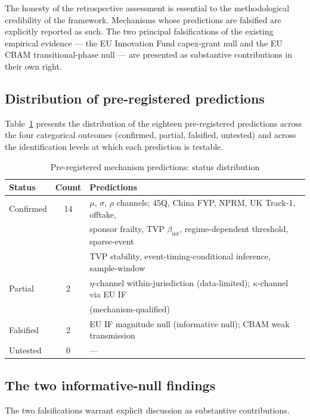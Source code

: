 \documentclass[12pt,a4paper]{article}
\newcommand{\bint}{\beta_{\text{int}}}
\theoremstyle{plain}
\theoremstyle{definition}
\begin{document}
The honesty of the retrospective assessment is essential to the methodological credibility of the framework. Mechanisms whose predictions are falsified are explicitly reported as such. The two principal falsifications of the existing empirical evidence --- the EU Innovation Fund capex-grant null and the EU CBAM transitional-phase null --- are presented as substantive contributions in their own right.

\subsection{Distribution of pre-registered predictions}
\label{sec:falsifiability-distribution}

Table~\ref{tab:falsifiability-summary} presents the distribution of the eighteen pre-registered predictions across the four categorical outcomes (confirmed, partial, falsified, untested) and across the identification levels at which each prediction is testable.

\begin{table}[!htbp]
\centering
\caption{Pre-registered mechanism predictions: status distribution}
\label{tab:falsifiability-summary}
\small
\begin{tabular}{lcl}
\toprule
Status & Count & Predictions \\
\midrule
Confirmed & 14 & $\mu$, $\sigma$, $\rho$ channels; 45Q, China FYP, NPRM, UK Track-1, offtake, \\
 & & sponsor frailty, TVP $\bint$, regime-dependent threshold, sparse-event \\
 & & TVP stability, event-timing-conditional inference, sample-window \\
Partial & 2 & $\eta$-channel within-jurisdiction (data-limited); $\kappa$-channel via EU IF \\
 & & (mechanism-qualified) \\
Falsified & 2 & EU IF magnitude null (informative null); CBAM weak transmission \\
Untested & 0 & --- \\
\bottomrule
\end{tabular}
\end{table}

\subsection{The two informative-null findings}
\label{sec:falsifiability-nulls}

The two falsifications warrant explicit discussion as substantive contributions.
\end{document}
